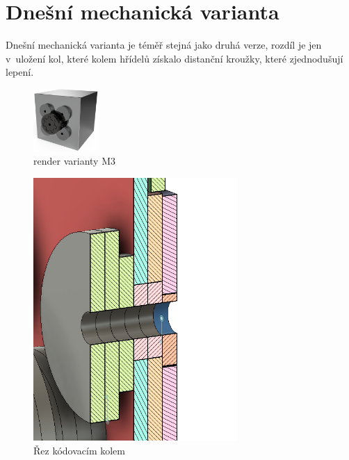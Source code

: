 \section{Dnešní mechanická varianta}

Dnešní mechanická varianta je téměř stejná jako druhá verze, rozdíl je jen v~uložení kol, které kolem hřídelů získalo distanční kroužky, které
zjednodušují lepení. 

\begin{figure}[htbp]
    \centering
    \includegraphics[width=70pt]{kapitoly/obrazky/M3/predni_render.png}
    \caption{render varianty M3}
    \label{fig:M3-render}
\end{figure}

\begin{figure}[htbp]
    \centering
    \includegraphics[width=220pt]{kapitoly/obrazky/M3/rez.png}
    \caption{Řez kódovacím kolem}
    \label{fig:M3-rez-kolem}
\end{figure}

\newpage